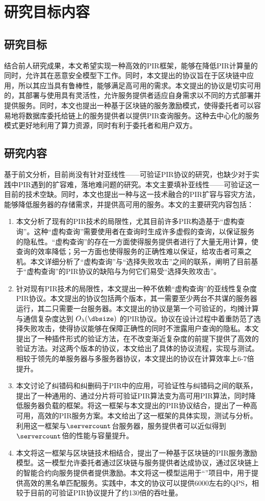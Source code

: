 \section{研究目标内容}

\subsection{研究目标}
结合前人研究成果，本文希望实现一种高效的PIR框架，能够在降低PIR计算量的同时，允许其在恶意安全模型下工作。同时，本文提出的协议旨在于区块链中应用，所以其应当具有鲁棒性，能够满足高可用的需求。本文提出的协议是切实可用的，其部署与使用具有灵活性，允许服务提供者适应自身需求以不同的方式部署并提供服务。同时，本文也提出一种基于区块链的服务激励模式，使得委托者可以容易地将数据库委托给链上的服务提供者以提供PIR查询服务。这种去中心化的服务模式更好地利用了算力资源，同时有利于委托者和用户双方。

\subsection{研究内容}

基于前文分析，目前尚没有针对亚线性——可验证PIR协议的研究，也缺少对于实践中PIR遇到的扩容难，落地难问题的研究。本文主要填补亚线性——可验证这一目前的技术空缺。同时，本文也提出一种与这一技术融合的PIR扩容与容灾方法，能够降低服务器的存储需求，并提供高可用的服务。本文的主要研究内容包括：
\begin{enumerate}
    \item 本文分析了现有的PIR技术的局限性，尤其目前许多PIR构造基于“虚构查询”。这种“虚构查询”需要使用者在查询时生成许多虚假的查询，以保证服务的隐私性。“虚构查询”的存在一方面使得服务提供者进行了大量无用计算，使查询的效率降低；另一方面也使得服务的正确性难以保证，给攻击者可乘之机。本文详细分析了“虚构查询”与“选择失败攻击”之间的联系，阐明了目前基于“虚构查询”的PIR协议的缺陷与为何它们易受“选择失败攻击”。
    \item 针对现有PIR技术的局限性，本文提出一种不依赖“虚构查询”的亚线性复杂度PIR协议。本文提出的协议包括两个版本，其一需要至少两台不共谋的服务器运行，其二只需要一台服务器。本文提出的协议是第一个可验证的，均摊计算与通信复杂度达到 $O_\lambda(\dbsize)$ 的PIR协议。协议在设计过程中着重防范了选择失败攻击，使得协议能够在保障正确性的同时不泄露用户查询的隐私。本文提出了一种插件形式的验证方法，在不改变渐近复杂度的前提下提供了高效的验证方法。对这两个版本的协议，本文给出了具体的协议流程，实现与测试。相较于领先的单服务器与多服务器协议，本文提出的协议在计算效率上6-7倍提升。
    \item 本文讨论了纠错码和纠删码于PIR中的应用，可验证性与纠错码之间的联系，提出了一种通用的、通过分片将可验证PIR算法变为高可用PIR算法，同时降低服务器负载的框架。将这一框架与本文提出的PIR协议结合，提出了一种高可用，高效的PIR服务方案。本文给出了这一框架的具体实现，测试与分析。利用这一框架与$\servercount$台服务器，服务提供者可以近似得到$\servercount$倍的性能与容量提升。
    \item 本文将这一框架与区块链技术相结合，提出了一种基于区块链的PIR服务激励模型。这一模型允许委托者通过区块链与服务提供者达成协议，通过区块链上的智能合约向服务提供者提供激励。本文将这一模型运用于“\projectname”项目中，用于提供高效的黑名单匹配服务。实践中，本文的协议可以提供6000左右的QPS，相较于目前的可验证PIR协议提升了约130倍的吞吐量。
\end{enumerate}
